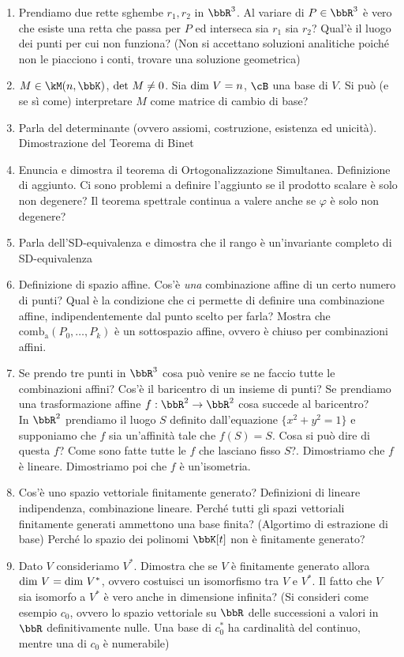 \documentclass[a4paper,NoNotes,GeneralMath]{stdmdoc}
\begin{document}
\begin{enumerate}
		\item Prendiamo due rette sghembe $r_1, r_2$ in $\bbR^3$. Al variare di $P \in \bbR^3$ è vero che esiste una retta che passa per $P$ ed interseca sia $r_1$ sia $r_2$? Qual'è il luogo dei punti per cui non funziona? (Non si accettano soluzioni analitiche poiché non le piacciono i conti, trovare una soluzione geometrica)
		\item $M \in \kM(n, \bbK)$, $\mbox{det } M \neq 0$. Sia $\mbox{dim } V = n$, $\cB$ una base di $V$. Si può (e se sì come) interpretare $M$ come matrice di cambio di base?
		\item Parla del determinante (ovvero assiomi, costruzione, esistenza ed unicità). Dimostrazione del Teorema di Binet
		\item Enuncia e dimostra il teorema di Ortogonalizzazione Simultanea. Definizione di aggiunto. Ci sono problemi a definire l'aggiunto se il prodotto scalare è solo non degenere? Il teorema spettrale continua a valere anche se $\varphi$ è solo non degenere?
		\item Parla dell'SD-equivalenza e dimostra che il rango è un'invariante completo di SD-equivalenza
		\item Definizione di spazio affine. Cos'è {\it una} combinazione affine di un certo numero di punti? Qual è la condizione che ci permette di definire una combinazione affine, indipendentemente dal punto scelto per farla? Mostra che $\text{comb}_\text{a} (P_0, \ldots, P_k)$ è un sottospazio affine, ovvero è chiuso per combinazioni affini.
		\item Se prendo tre punti in $\bbR^3$ cosa può venire se ne faccio tutte le combinazioni affini? Cos'è il baricentro di un insieme di punti? Se prendiamo una trasformazione affine $f:\bbR^2 \rar \bbR^2$ cosa succede al baricentro? \\ In $\bbR^2$ prendiamo il luogo $S$ definito dall'equazione $\{ x^2 + y^2 = 1\}$ e supponiamo che $f$ sia un'affinità tale che $f(S) = S$. Cosa si può dire di questa $f$? Come sono fatte tutte le $f$ che lasciano fisso $S$?. Dimostriamo che $f$ è lineare. Dimostriamo poi che $f$ è un'isometria.
		\item Cos'è uno spazio vettoriale finitamente generato? Definizioni di lineare indipendenza, combinazione lineare. Perché tutti gli spazi vettoriali finitamente generati ammettono una base finita? (Algortimo di estrazione di base) Perché lo spazio dei polinomi $\bbK[t]$ non è finitamente generato?
		\item Dato $V$ consideriamo $V^{*}$. Dimostra che se $V$ è finitamente generato allora $\mbox{dim } V = \mbox{dim } V^{*}$, ovvero costuisci un isomorfismo tra $V$ e $V^{*}$. Il fatto che $V$ sia isomorfo a $V^{*}$ è vero anche in dimensione infinita? (Si consideri come esempio $c_0$, ovvero lo spazio vettoriale su $\bbR$ delle successioni a valori in $\bbR$ definitivamente nulle. Una base di $c_0^{*}$ ha cardinalità del continuo, mentre una di $c_0$ è numerabile)

\end{enumerate}
\end{document}
